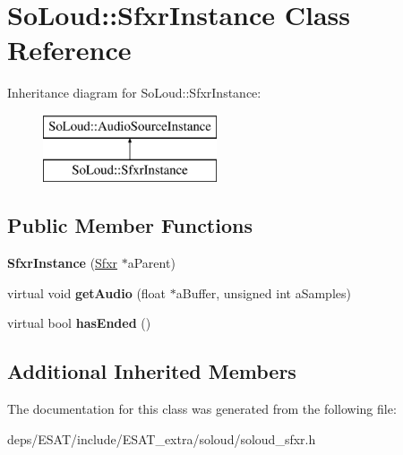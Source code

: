 \hypertarget{class_so_loud_1_1_sfxr_instance}{}\section{So\+Loud\+:\+:Sfxr\+Instance Class Reference}
\label{class_so_loud_1_1_sfxr_instance}
Inheritance diagram for So\+Loud\+:\+:Sfxr\+Instance\+:\begin{figure}[H]
\begin{center}
\leavevmode
\includegraphics[height=2.000000cm]{class_so_loud_1_1_sfxr_instance}
\end{center}
\end{figure}
\subsection*{Public Member Functions}
\begin{DoxyCompactItemize}
\item 
\mbox{\label{class_so_loud_1_1_sfxr_instance_a2308816da00b1f5f191e90c9bc97e146}} 
{\bfseries Sfxr\+Instance} (\mbox{\hyperlink{class_so_loud_1_1_sfxr}{Sfxr}} $\ast$a\+Parent)
\item 
\mbox{\label{class_so_loud_1_1_sfxr_instance_a40f37c9ecaf740cc5a2d7c5ae760f6ca}} 
virtual void {\bfseries get\+Audio} (float $\ast$a\+Buffer, unsigned int a\+Samples)
\item 
\mbox{\label{class_so_loud_1_1_sfxr_instance_ac1ca3338a70bf268384bcc89fe4a3de4}} 
virtual bool {\bfseries has\+Ended} ()
\end{DoxyCompactItemize}
\subsection*{Additional Inherited Members}


The documentation for this class was generated from the following file\+:\begin{DoxyCompactItemize}
\item 
deps/\+E\+S\+A\+T/include/\+E\+S\+A\+T\+\_\+extra/soloud/soloud\+\_\+sfxr.\+h\end{DoxyCompactItemize}
